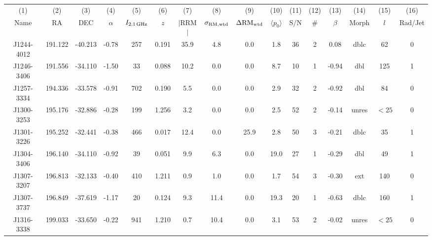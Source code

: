 \documentclass{mnras}
\newcommand*\sigmaRMwtd{\sigma_{\rm RM, wtd}}
\newcommand*\gradRMwtd{\Delta{\rm RM_{wtd}}}
\begin{document}
{\tiny
\begin{table*}%
 \contcaption{ }
 \scriptsize
 \centering
   \begin{tabular}{cccccccccccccccc}
    \hline\hline
       (1) & (2) & (3) & (4) & (5) & (6) & (7) & (8) & (9) & (10) & (11) & (12) & (13) & (14) & (15) & (16)  \\
Name  & RA & DEC & $\alpha$ &   $I_{2.1\,{\rm GHz}}$ &  $z$ &  $|$RRM$|$ &  $\sigmaRMwtd$ &  $\gradRMwtd$ &  $\langle p_{0} \rangle$ &  S/N &  \# &  $\beta$ &  Morph &  $l$ &  Rad/Jet \\
      \hline 
J1244-4012 & 191.122 & -40.213 & -0.78 & 257 & 0.191 & 35.9 & 4.8 & 0.0 & 1.8 & 36 & 2 & 0.08 & dblc & 62 & 0 \\ 

J1246-3406 & 191.556 & -34.110 & -1.50 & 33 & 0.088 & 10.2 & 0.0 & 0.0 & 8.7 & 10 & 1 & -0.94 & dbl & 125 & 1 \\ 

J1257-3334 & 194.336 & -33.578 & -0.91 & 702 & 0.190 & 5.5 & 0.0 & 0.0 & 2.9 & 32 & 2 & -0.92 & dbl & 84 & 0 \\ 

J1300-3253 & 195.176 & -32.886 & -0.28 & 199 & 1.256 & 3.2 & 0.0 & 0.0 & 2.5 & 52 & 2 & -0.14 & unres & $<25$ & 0 \\ 

J1301-3226 & 195.252 & -32.441 & -0.38 & 466 & 0.017 & 12.4 & 0.0 & 25.9 & 2.8 & 50 & 3 & -0.21 & dblc & 35 & 1 \\ 

J1304-3406 & 196.140 & -34.110 & -0.92 & 39 & 0.051 & 9.9 & 6.3 & 0.0 & 19.0 & 27 & 1 & -0.29 & dbl & 49 & 1 \\ 

J1307-3207 & 196.813 & -32.133 & -0.40 & 410 & 1.211 & 0.9 & 1.0 & 0.0 & 1.7 & 54 & 3 & -0.30 & ext & 140 & 0 \\ 

J1307-3737 & 196.849 & -37.619 & -1.17 & 20 & 0.124 & 9.3 & 11.4 & 0.0 & 19.3 & 20 & 1 & -0.63 & dblc & 160 & 1 \\ 

J1316-3338 & 199.033 & -33.650 & -0.22 & 941 & 1.210 & 0.7 & 10.4 & 0.0 & 3.1 & 53 & 2 & -0.02 & unres & $<25$ & 0 \\ 


\end{tabular}
\end{table*}}
\end{document}

